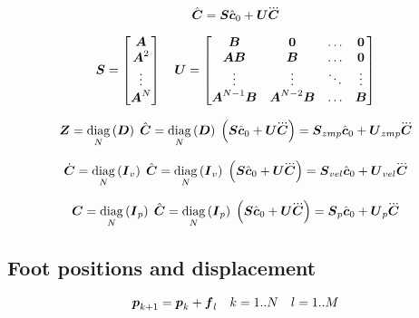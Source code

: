 \begin{equation*}
\cState = \M{S} \cstate_0     +   \M{U} \cJerk
\end{equation*}

\begin{equation*}
    \mbox{\boldmath $S$} =
        \begin{bmatrix}
        \mbox{\boldmath $A$} \\
        \mbox{\boldmath $A$}^2 \\
        \vdots \\
        \mbox{\boldmath $A$}^{N}\\
        \end{bmatrix}
    \quad
    \mbox{\boldmath $U$} =
        \begin{bmatrix}
        \mbox{\boldmath $B$}               & \mbox{\boldmath $0$}             & \dots & \mbox{\boldmath $0$} \\
        \mbox{\boldmath $A$}\mbox{\boldmath $B$}          & \mbox{\boldmath $B$}             & \dots & \mbox{\boldmath $0$} \\
        \vdots              & \vdots            & \ddots& \vdots \\
        \mbox{\boldmath $A$}^{N-1}\mbox{\boldmath $B$}    & \mbox{\boldmath $A$}^{N-2}\mbox{\boldmath $B$}  & \dots & \mbox{\boldmath $B$} \\
        \end{bmatrix}
\end{equation*}

\begin{equation*}
    \ZMP = 
        \diag{N}{\M{D}} \cState = 
        \diag{N}{\M{D}} \left(\M{S} \cstate_0  +  \M{U} \cJerk \right) = 
        \M{S}_{zmp} \cstate_0 + \M{U}_{zmp} \cJerk
\end{equation*}

\begin{equation*}
    \cVel = 
        \diag{N}{\M{I}_{v}} \cState = 
        \diag{N}{\M{I}_{v}} \left(\M{S} \cstate_0  +  \M{U} \cJerk \right) = 
        \M{S}_{vel} \cstate_0 + \M{U}_{vel} \cJerk
\end{equation*}

\begin{equation*}
    \cPos = 
        \diag{N}{\M{I}_{p}} \cState = 
        \diag{N}{\M{I}_{p}} \left(\M{S} \cstate_0  +  \M{U} \cJerk \right) = 
        \M{S}_{p} \cstate_0 + \M{U}_{p} \cJerk
\end{equation*}


\subsection{Foot positions and displacement}
\begin{equation*}
    \mbox{\boldmath $p$}_{k+1} = \mbox{\boldmath $p$}_k + \mbox{\boldmath $f$}_{l}
    \quad
    k = 1..N
    \quad
    l = 1..M
\end{equation*}

